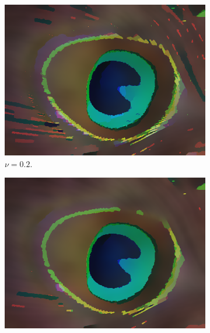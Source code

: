 \documentclass[abstracton]{scrreprt}
\begin{document}
\begin{figure}[!ht]
                \begin{subfigure}[b]{0.24\textwidth}
                    \includegraphics[width=\textwidth]{img/segmentation/rt/02peacock-feather.png}
                    \caption{$\nu = 0.2$.}
                \end{subfigure}
                \begin{subfigure}[b]{0.24\textwidth}
                    \includegraphics[width=\textwidth]{img/segmentation/rt/03peacock-feather.png}

\end{subfigure}
\end{figure}
\end{document}
